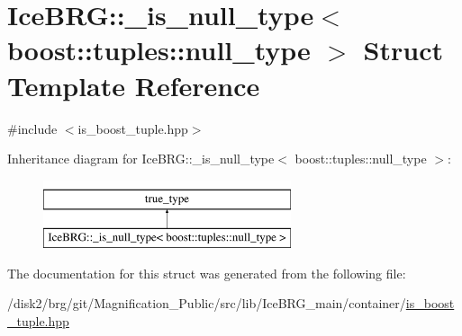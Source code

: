 \hypertarget{structIceBRG_1_1__is__null__type_3_01boost_1_1tuples_1_1null__type_01_4}{}\section{Ice\+B\+R\+G\+:\+:\+\_\+is\+\_\+null\+\_\+type$<$ boost\+:\+:tuples\+:\+:null\+\_\+type $>$ Struct Template Reference}
\label{structIceBRG_1_1__is__null__type_3_01boost_1_1tuples_1_1null__type_01_4}


{\ttfamily \#include $<$is\+\_\+boost\+\_\+tuple.\+hpp$>$}

Inheritance diagram for Ice\+B\+R\+G\+:\+:\+\_\+is\+\_\+null\+\_\+type$<$ boost\+:\+:tuples\+:\+:null\+\_\+type $>$\+:\begin{figure}[H]
\begin{center}
\leavevmode
\includegraphics[height=2.000000cm]{structIceBRG_1_1__is__null__type_3_01boost_1_1tuples_1_1null__type_01_4}
\end{center}
\end{figure}


The documentation for this struct was generated from the following file\+:\begin{DoxyCompactItemize}
\item 
/disk2/brg/git/\+Magnification\+\_\+\+Public/src/lib/\+Ice\+B\+R\+G\+\_\+main/container/\hyperlink{is__boost__tuple_8hpp}{is\+\_\+boost\+\_\+tuple.\+hpp}\end{DoxyCompactItemize}
